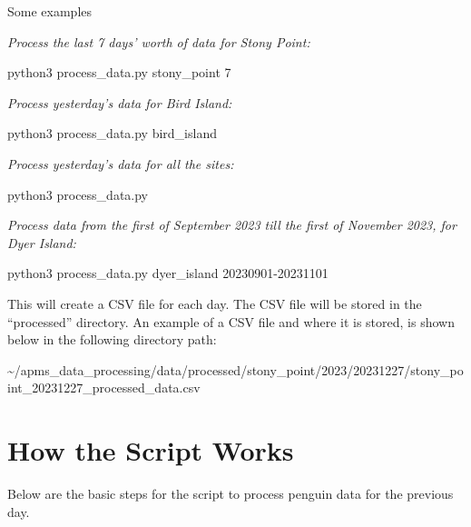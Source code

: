 \documentclass[
  letterpaper,
]{scrbook}
\newenvironment{Shaded}{\begin{snugshade}}{\end{snugshade}}
\newcommand{\ExtensionTok}[1]{\textcolor[rgb]{0.00,0.23,0.31}{#1}}
\newcommand{\NormalTok}[1]{\textcolor[rgb]{0.00,0.23,0.31}{#1}}
\begin{document}
Some examples

\emph{Process the last 7 days' worth of data for Stony Point:}

\begin{Shaded}
\begin{Highlighting}[]
\ExtensionTok{python3}\NormalTok{ process\_data.py stony\_point 7}
\end{Highlighting}
\end{Shaded}

\emph{Process yesterday's data for Bird Island:}

\begin{Shaded}
\begin{Highlighting}[]
\ExtensionTok{python3}\NormalTok{ process\_data.py bird\_island}
\end{Highlighting}
\end{Shaded}

\emph{Process yesterday's data for all the sites:}

\begin{Shaded}
\begin{Highlighting}[]
\ExtensionTok{python3}\NormalTok{ process\_data.py}
\end{Highlighting}
\end{Shaded}

\emph{Process data from the first of September 2023 till the first of
November 2023, for Dyer Island:}

\begin{Shaded}
\begin{Highlighting}[]
\ExtensionTok{python3}\NormalTok{ process\_data.py dyer\_island 20230901{-}20231101}
\end{Highlighting}
\end{Shaded}

This will create a CSV file for each day. The CSV file will be stored in
the ``processed'' directory. An example of a CSV file and where it is
stored, is shown below in the following directory path:

\textasciitilde/apms\_data\_processing/data/processed/stony\_point/2023/20231227/stony\_point\_20231227\_processed\_data.csv

\section{How the Script Works}\label{how-the-script-works}

Below are the basic steps for the script to process penguin data for the
previous day.
\end{document}
